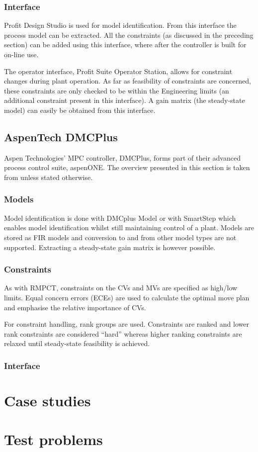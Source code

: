 \subsubsection{Interface}
Profit Design Studio is used for model identification.
From this interface the process model can be extracted.
All the constraints (as discussed in the preceding section) can be added using this interface, where after the controller is built for on-line use.

The operator interface, Profit Suite Operator Station, allows for constraint changes during plant operation.
As far as feasibility of constraints are concerned, these constraints are only checked to be within the Engineering limits (an additional constraint present in this interface).
A gain matrix (the steady-state model) can easily be obtained from this interface.


\subsection{AspenTech DMCPlus}
Aspen Technologies' MPC controller, DMCPlus, forms part of their advanced process control suite, aspenONE.
The overview presented in this section is taken from \citet{aspentech1} unless stated otherwise.

\subsubsection{Models}
Model identification is done with DMCplus Model or with SmartStep which enables model identification whilst still maintaining control of a plant.
Models are stored as FIR models and conversion to and from other model types are not supported.
Extracting a steady-state gain matrix is however possible.

\subsubsection{Constraints}
As with RMPCT, constraints on the CVs and MVs are specified as high/low limits.
Equal concern errors (ECEs) are used to calculate the optimal move plan and emphasise the relative importance of CVs.

For constraint handling, rank groups are used.
Constraints are ranked and lower rank constraints are considered ``hard'' whereas higher ranking constraints are relaxed until steady-state feasibility is achieved.

\subsubsection{Interface}

\section{Case studies}

\section{Test problems}

